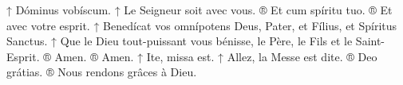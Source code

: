 \vspace{0.3cm}

\begin{paracol}{2}
\LigneParacol{0cm}
{↑ Dóminus vobíscum.}
{↑ Le Seigneur soit avec vous.}
\LigneParacol{0cm}
{® Et cum spíritu tuo.}
{® Et avec votre esprit.}
\LigneParacol{0cm}
{↑ Benedícat vos omnípotens Deus, Pater, et Fílius, et Spíritus Sanctus.}
{↑ Que le Dieu tout-puissant vous bénisse, le Père, le Fils et le Saint-Esprit.}
\LigneParacol{0cm}
{® Amen.}
{® Amen.}
\LigneParacol{0cm}
{↑ Ite, missa est.}
{↑ Allez, la Messe est dite.}
\LigneParacol{0cm}
{® Deo grátias.}
{® Nous rendons grâces à Dieu.}
\end{paracol}

